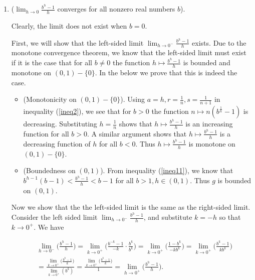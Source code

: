 \begin{enumerate}
    \item ($\lim_{h \rightarrow 0} \frac{b^h - 1}{h}$ converges for all nonzero real numbers $b$).
    
    Clearly, the limit does not exist when $b = 0$. 
        
    First, we will show that the left-sided limit $\lim_{h \rightarrow 0^-} \frac{b^h - 1}{h}$ exists. Due to the monotone convergence theorem, we know that the left-sided limit must exist if it is the case that for all $b \neq 0$ the function $h \mapsto \frac{b^h - 1}{h}$ is bounded and monotone on $(0, 1) - \{0\}$. In the below we prove that this is indeed the case.
    
    \begin{itemize}
        \item (Monotonicity on $(0, 1) - \{0\}$). Using $a = h, r = \frac{1}{n}, s = \frac{1}{n + 1}$ in inequality (\ref{ineq2}), we see that for $b > 0$ the function $n \mapsto n(b^{\frac{1}{n}} - 1)$ is decreasing. Substituting $h = \frac{1}{n}$ shows that $h \mapsto \frac{b^h - 1}{h}$ is an increasing function for all $b > 0$. A similar argument shows that $h \mapsto \frac{b^h - 1}{h}$ is a decreasing function of $h$ for all $b < 0$. Thus $h \mapsto \frac{b^h - 1}{h}$ is monotone on $(0, 1) - \{0\}$.
        \item (Boundedness on $(0, 1)$). From inequality (\ref{ineq11}), we know that $b^{h - 1}(b - 1) < \frac{b^h - 1}{h} < b - 1$ for all $b > 1, h \in (0, 1)$. Thus $g$ is bounded on $(0, 1)$.
    \end{itemize}
    
    Now we show that the the left-sided limit is the same as the right-sided limit. Consider the left sided limit $\lim_{h \rightarrow 0^-} \frac{b^h - 1}{h}$, and substitute $k = -h$ so that $k \rightarrow 0^+$. We have
    
    \begin{align*}
        &\lim_{h \rightarrow 0^-} \Big( \frac{b^h - 1}{h} \Big) 
        = \lim_{k \rightarrow 0^+} \Big( \frac{b^{-k} - 1}{-k} \cdot \frac{b^k}{b^k} \Big) 
        = \lim_{k \rightarrow 0^+} \Big( \frac{1 - b^k}{-kb^k} \Big)
        = \lim_{k \rightarrow 0^+} \Big( \frac{b^k - 1}{kb^k} \Big) \\ 
        &= \frac{\lim_{k \rightarrow 0^+} \Big( \frac{b^k - 1}{k} \Big)}{\lim_{k \rightarrow 0^+} (b^k)}
        = \frac{\lim_{k \rightarrow 0^+} \Big( \frac{b^k - 1}{k} \Big)}{1}
        = \lim_{h \rightarrow 0^+} \Big( \frac{b^h - 1}{h} \Big).
    \end{align*}
    

\end{enumerate}

